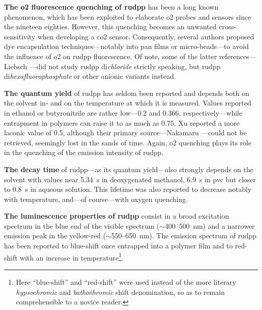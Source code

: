 \textbf{The \gls{o2} fluorescence quenching of \gls{rudpp}} has been a long known phenomenon, which has been exploited to elaborate \gls{o2} probes and sensors since the nineteen eighties\cite{bacon1987, baker2000, xu1994, mills2013}. However, this quenching becomes an unwanted cross-sensitivity when developing a \gls{co2} sensor. Consequently, several authors proposed dye encapsulation techniques---notably into \gls{pan} films or micro-beads\cite{liebsch1999, bultzingslowen2002, burke2006, cajlakovic2006}---to avoid the influence of \gls{o2} on \gls{rudpp} fluorescence. Of note, some of the latter references---\eg{} Liebsch \etal{}\cite{liebsch1999}---did not study \gls{rudpp} di\emph{chloride} strictly speaking, but \gls{rudpp} di\emph{hexafluorophosphate} or other anionic variants instead.

\textbf{The quantum yield} of \gls{rudpp} has seldom been reported and depends both on the solvent in- and on the temperature at which it is measured. Values reported in ethanol\cite{alford1985} or butyronitrile\cite{kapturkiewicz1995} are rather low---0.2 and 0.366, respectively---while entrapment in polymers can raise it to as much as 0.75\cite{alford1985}. Xu \etal{}\cite{xu1994} reported a more laconic value of 0.5, although their primary source---Nakamaru \etal{}\cite{nakamaru1979}---could not be retrieved, seemingly lost in the sands of time. Again, \gls{o2} quenching plays its role in the quenching of the emission intensity of \gls{rudpp}\cite{mills2013}.

\textbf{The decay time} of \gls{rudpp}---as its quantum yield---also strongly depends on the solvent with values near 5.34~\textmu{}s in deoxygenated methanol\cite{demas1977}, 6.9~\textmu{}s in \gls{pvc}\cite{alford1985} but closer to 0.8~\textmu{}s in aqueous solution\cite{liebsch1999}. This lifetime was also reported to decrease notably with temperature\cite{bacon1987, liebsch1999}, and---of course---with oxygen quenching\cite{bacon1987}.

\textbf{The luminescence properties of \gls{rudpp}} consist in a broad excitation spectrum in the blue end of the visible spectrum ($\sim$400--500~nm) and a narrower emission peak in the yellow-red ($\sim$550--650~nm). The emission spectrum of \gls{rudpp} has been reported to blue-shift once entrapped into a polymer film\cite{alford1985} and to red-shift with an increase in temperature\cite{baker2000}\footnote{Here \enquote{blue-shift} and \enquote{red-shift} were used instead of the more literary \emph{hypsochromic} and \emph{bathochromic} shift denomination, so as to remain comprehensible to a novice reader.}.

